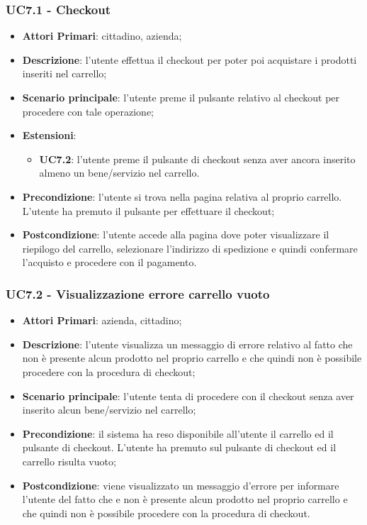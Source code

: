 \subsubsection{UC7.1 - Checkout}
\begin{itemize}
	\item \textbf{Attori Primari}: cittadino, azienda;
	\item \textbf{Descrizione}: l'utente effettua il checkout per poter poi acquistare i prodotti inseriti nel carrello;
	\item \textbf{Scenario principale}: l'utente preme il pulsante relativo al checkout per procedere con tale operazione;
	\item \textbf{Estensioni}: 
	\begin{itemize}
		\item \textbf{UC7.2}: l'utente preme il pulsante di checkout senza aver ancora inserito almeno un bene/servizio nel carrello.
	\end{itemize}
	\item \textbf{Precondizione}: l'utente si trova nella pagina relativa al proprio carrello. L'utente ha premuto il pulsante per effettuare il checkout;
	\item \textbf{Postcondizione}: l'utente accede alla pagina dove poter visualizzare il riepilogo del carrello, selezionare l'indirizzo di spedizione e quindi confermare l'acquisto e procedere con il pagamento.
\end{itemize}

\subsubsection{UC7.2 - Visualizzazione errore carrello vuoto}
\begin{itemize}
	\item \textbf{Attori Primari}: azienda, cittadino;
	\item \textbf{Descrizione}:
	l'utente visualizza un messaggio di errore relativo al fatto che non è presente alcun prodotto nel proprio carrello e che quindi non è possibile procedere con la procedura di checkout;
	\item \textbf{Scenario principale}: l'utente tenta di procedere con il checkout senza aver inserito alcun bene/servizio nel carrello;
	\item \textbf{Precondizione}: il sistema ha reso disponibile all'utente il carrello ed il pulsante di checkout. L'utente ha premuto sul pulsante di checkout ed il carrello risulta vuoto; 
	\item \textbf{Postcondizione}: viene visualizzato un messaggio d'errore per informare l'utente del fatto che e non è presente alcun prodotto nel proprio carrello e che quindi non è possibile procedere con la procedura di checkout.
\end{itemize}


